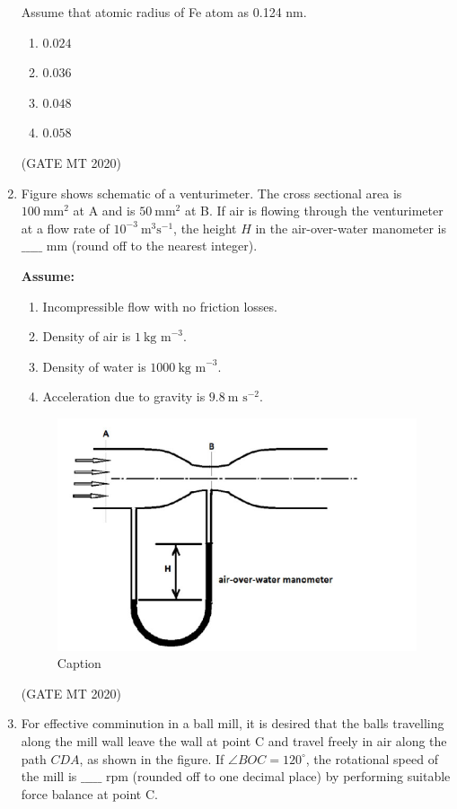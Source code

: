 \documentclass[journal, 11pt, onecolumn]{IEEEtran}
\theoremstyle{remark}
\begin{document}
\begin{enumerate}
Assume that atomic radius of Fe atom as 0.124 nm.  

\begin{enumerate} 
\item $0.024$  
\item $0.036$  
\item $0.048$  
\item $0.058$  
\end{enumerate}
\hfill(GATE MT 2020)


\item Figure shows schematic of a venturimeter. The cross sectional area is $100 \ \text{mm}^2$ at A and is $50 \ \text{mm}^2$ at B. If air is flowing through the venturimeter at a flow rate of $10^{-3} \ \text{m}^3 \text{s}^{-1}$, the height $H$ in the air-over-water manometer is $\_\_\_\_\_$ mm (round off to the nearest integer).  

\textbf{Assume:}  
\begin{enumerate}
\item Incompressible flow with no friction losses.  
\item Density of air is $1 \ \text{kg m}^{-3}$.  
\item Density of water is $1000 \ \text{kg m}^{-3}$.  
\item Acceleration due to gravity is $9.8 \ \text{m s}^{-2}$.  
\end{enumerate}

\begin{figure}[H]
    \centering
    \includegraphics[width=0.5\linewidth]{figs/image8''.png}
    \caption{Caption}
    \label{fig:placeholder}
\end{figure}
\hfill(GATE MT 2020)


\item For effective comminution in a ball mill, it is desired that the balls travelling along the mill wall leave the wall at point C and travel freely in air along the path $CDA$, as shown in the figure. If $\angle BOC = 120^\circ$, the rotational speed of the mill is $\_\_\_\_\_$ rpm (rounded off to one decimal place) by performing suitable force balance at point C.  


\end{enumerate}
\end{document}
